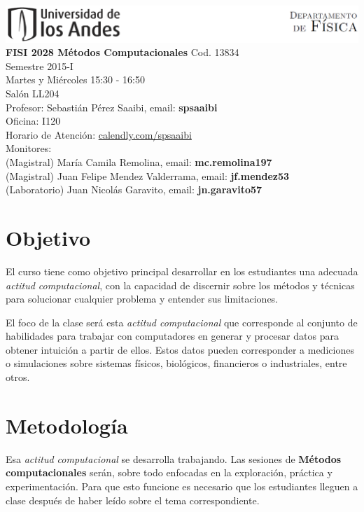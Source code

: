 \documentclass[11pt]{article}
\begin{document}
\includegraphics[width=490pt]{header.png}\\[0.5cm]

\noindent
\textbf{FISI 2028 Métodos Computacionales}
Cod. 13834\\
Semestre 2015-I\\
Martes y Mi\'ercoles 15:30 - 16:50 \\
Salón LL204\\
Profesor: Sebastián Pérez Saaibi, email: \textbf{spsaaibi}\\
Oficina: I120\\
Horario de Atención: \url{calendly.com/spsaaibi} \\
Monitores: \\
(Magistral) María Camila Remolina, email: \textbf{mc.remolina197}\\
(Magistral) Juan Felipe Mendez Valderrama, email: \textbf{jf.mendez53}\\
(Laboratorio) Juan Nicolás Garavito, email:  \textbf{jn.garavito57}\\


\section*{Objetivo}
El curso tiene como objetivo principal desarrollar en los
estudiantes una adecuada \emph{actitud computacional}, con la capacidad de
discernir sobre los m\'etodos y t\'ecnicas para solucionar cualquier 
problema y entender sus limitaciones.
 
El foco de la clase ser\'a esta \emph{actitud computacional} que
corresponde al conjunto de habilidades para trabajar con computadores
en generar y procesar datos para obtener intuici\'on a partir de ellos. Estos datos pueden
corresponder a mediciones o simulaciones sobre sistemas f\'isicos, biol\'ogicos, financieros o industriales, entre otros.

\section*{Metodolog\'ia}
Esa \emph{actitud computacional} se desarrolla trabajando. Las
sesiones de \textbf{M\'etodos computacionales} ser\'an, sobre todo 
enfocadas en la exploraci\'on, pr\'actica y experimentaci\'on. Para que esto
funcione es necesario que los estudiantes lleguen a clase despu\'es de
haber le\'ido sobre el tema correspondiente. 
\end{document}
